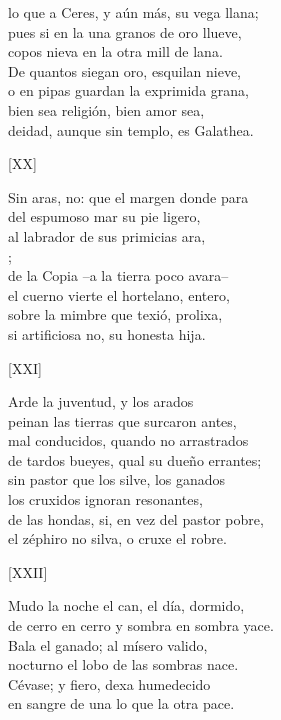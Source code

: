 \documentclass[11pt,a4paper,twoside]{article}
\begin{document}
lo que a Ceres, y aún más, su vega llana;\\
pues si en la una granos de oro llueve,\\
copos nieva en la otra mill de lana.\\
De quantos siegan oro, esquilan nieve,\\
o en pipas guardan la exprimida grana,\\
bien sea religión, bien amor sea,\\
deidad, aunque sin templo, es Galathea.\pend
\begin{center}
	[XX]
\end{center}\pstart
Sin aras, no: que el margen donde para\\
del espumoso mar su pie ligero,\\
al labrador de sus primicias ara,\\
;\\
de la Copia --a la tierra poco avara--\\
el cuerno vierte el hortelano, entero,\\
sobre la mimbre que texió, prolixa,\\
si artificiosa no, su honesta hija.\pend
\begin{center}
	[XXI]
\end{center}\pstart
Arde la juventud, y los arados\\
peinan las tierras que surcaron antes,\\
mal conducidos, quando no arrastrados\\
de tardos bueyes, qual su dueño errantes;\\
sin pastor que los silve, los ganados\\
los cruxidos ignoran resonantes,\\
de las hondas, si, en vez del pastor pobre,\\
el zéphiro no silva, o cruxe el robre.\pend
\begin{center}
	[XXII]
\end{center}\pstart
Mudo la noche el can, el día, dormido,\\
de cerro en cerro y sombra en sombra yace.\\
Bala el ganado; al mísero valido,\\
nocturno el lobo de las sombras nace.\\
Cévase; y fiero, dexa humedecido\\
en sangre de una lo que la otra pace.\\
\end{document}
